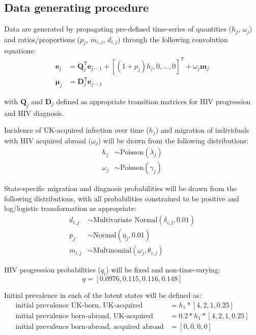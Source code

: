 \documentclass[11pt, a4paper]{article}
\begin{document}
\subsection{Data generating procedure}

Data are generated by propagating pre-defined time-series of quantities ($h_j$, $\omega_j$) and ratios/proportions ($p_j$, $m_{i,j}$, $d_{i,j}$) through the following convolution equations:
%
\begin{align*}
  \bm{e}_j   & = \mathbf{Q}_j^\mathsf{T} \bm{e}_{j-1} + {[(1 + p_j)h_j, 0, \ldots,0]}^\mathsf{T} + \omega_j\bm{m}_j \\
  \bm{\mu}_j & = \mathbf{D}_j^\mathsf{T} \bm{e}_{j-1}
\end{align*}

with $\mathbf{Q}_{j}$ and $\mathbf{D}_j$ defined as appropriate transition matrices for HIV progression and HIV diagnosis.

Incidence of UK-acquired infection over time ($h_j$) and migration of individuals with HIV acquired abroad ($\omega_j$) will be drawn from the following distributions:
%
\begin{align*}
  h_j &\sim \text{Poisson}(\lambda_j) \\
  \omega_j &\sim \text{Poisson}(\gamma_j)
\end{align*}

State-specific migration and diagnosis probabilities will be drawn from the following distributions, with all probabilities constrained to be positive and log/logistic transformation as appropriate:
%
\begin{align*}
  d_{i,j} &\sim \text{Multivariate Normal}(\delta_{i,j}, 0.01) \\
  p_j &\sim \text{Normal}(\eta_j, 0.01) \\
  m_{i,j} &\sim \text{Multinomial}(\omega_j, \theta_{i,j})
\end{align*}

HIV progression probabilities ($q_i$) will be fixed and non-time-varying:
%
\[
  q = \left[0.0976, 0.115, 0.116, 0.148\right]
\]

Initial prevalence in each of the latent states will be defined as:
%
\begin{align*}
  \text{initial prevalence UK-born, UK-acquired} &= h_1 * \left[4, 2, 1, 0.25\right] \\
  \text{initial prevalence born-abroad, UK-acquired} &= 0.2 * h_1 * \left[4, 2, 1, 0.25\right] \\
  \text{initial prevalence born-abroad, acquired abroad} &= \left[0, 0, 0, 0\right]
\end{align*}
\end{document}
